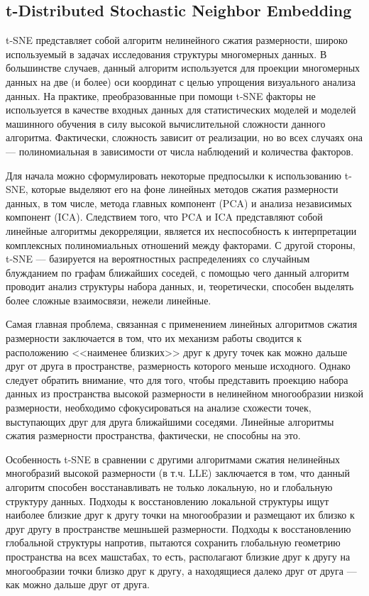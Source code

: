 \documentclass[runningheads]{llncs}
\begin{document}
\subsection{t-Distributed Stochastic Neighbor Embedding}
\hspace{0.4cm}
t-SNE представляет собой алгоритм нелинейного сжатия размерности, широко используемый в задачах исследования структуры многомерных данных. В большинстве случаев, данный алгоритм используется для проекции многомерных данных на две (и более) оси координат с целью упрощения визуального анализа данных. На практике, преобразованные при помощи t-SNE факторы не используется в качестве входных данных для статистических моделей и моделей машинного обучения в силу высокой вычислительной сложности данного алгоритма. Фактически, сложность зависит от реализации, но во всех случаях она — полиномиальная в зависимости от числа наблюдений и количества факторов. \par

Для начала можно сформулировать некоторые предпосылки к использованию t-SNE, которые выделяют его на фоне линейных методов сжатия размерности данных, в том числе, метода главных компонент (PCA) и анализа независимых компонент (ICA). Следствием того, что PCA и ICA представляют собой линейные алгоритмы декорреляции, является их неспособность к интерпретации комплексных полиномиальных отношений между факторами. С другой стороны, t-SNE — базируется на вероятностных распределениях со случайным блужданием по графам ближайших соседей, с помощью чего данный алгоритм проводит анализ структуры набора данных, и, теоретически, способен выделять более сложные взаимосвязи, нежели линейные.\par

Самая главная проблема, связанная с применением линейных алгоритмов сжатия размерности заключается в том, что их механизм работы сводится к расположению <<наименее близких>> друг к другу точек как можно дальше друг от друга в пространстве, размерность которого меньше исходного. Однако следует обратить внимание, что для того, чтобы представить проекцию набора данных из пространства высокой размерности в нелинейном многообразии низкой размерности, необходимо сфокусироваться на анализе схожести точек, выступающих друг для друга ближайшими соседями. Линейные алгоритмы сжатия размерности пространства, фактически, не способны на это. \par

Особенность t-SNE в сравнении с другими алгоритмами сжатия нелинейных многобразий высокой размерности (в т.ч. LLE) заключается в том, что данный алгоритм способен восстанавливать не только локальную, но и глобальную структуру данных. Подходы к восстановлению локальной структуры ищут наиболее близкие друг к другу точки на многообразии и размещают их близко к друг другу в пространстве мешньшей размерности. Подходы к восстановлению глобальной структуры напротив, пытаются сохранить глобальную геометрию пространства на всех машстабах, то есть, располагают близкие друг к другу на многообразии точки близко друг к другу, а находящиеся далеко друг от друга — как можно дальше друг от друга. \par
\end{document}
